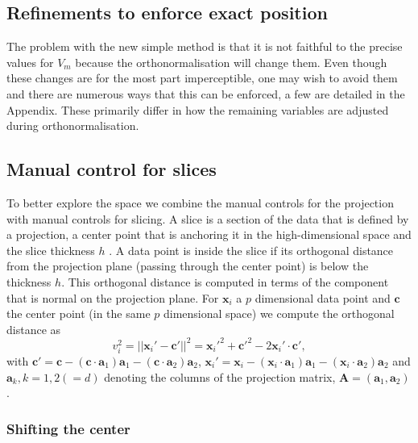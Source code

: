 \documentclass[]{interact}
\theoremstyle{plain}%
\theoremstyle{definition}
\theoremstyle{remark}
\begin{document}
\hypertarget{refinements-to-enforce-exact-position}{%
\subsection{Refinements to enforce exact
position}\label{refinements-to-enforce-exact-position}}

The problem with the new simple method is that it is not faithful to the
precise values for \(V_m\) because the orthonormalisation will change
them. Even though these changes are for the most part imperceptible, one
may wish to avoid them and there are numerous ways that this can be
enforced, a few are detailed in the Appendix. These primarily differ in
how the remaining variables are adjusted during orthonormalisation.

\hypertarget{manual-control-for-slices}{%
\subsection{Manual control for slices}\label{manual-control-for-slices}}

To better explore the space we combine the manual controls for the
projection with manual controls for slicing. A slice is a section of the
data that is defined by a projection, a center point that is anchoring
it in the high-dimensional space and the slice thickness \(h\)
\citep{slicetour}. A data point is inside the slice if its orthogonal
distance from the projection plane (passing through the center point) is
below the thickness \(h\). This orthogonal distance is computed in terms
of the component that is normal on the projection plane. For
\(\mathbf{x}_i\) a \(p\) dimensional data point and \(\mathbf{c}\) the
center point (in the same \(p\) dimensional space) we compute the
orthogonal distance as \begin{equation}
v_i^2 = ||\mathbf{x}_i' - \mathbf{c}'||^2 = \mathbf{x}_i'^2 + \mathbf{c}'^2 - 2 \mathbf{x}_i'\cdot\mathbf{c}' ,
\label{eq:slice}
\end{equation} with
\(\mathbf{c}' = \mathbf{c} - (\mathbf{c}\cdot \mathbf{a}_1) \mathbf{a}_1 - (\mathbf{c}\cdot \mathbf{a}_2 )\mathbf{a}_2\),
\(\mathbf{x}_i' = \mathbf{x}_i - (\mathbf{x}_i\cdot \mathbf{a}_1) \mathbf{a}_1 - (\mathbf{x}_i\cdot \mathbf{a}_2) \mathbf{a}_2\)
and \(\mathbf{a}_k, k=1,2 (=d)\) denoting the columns of the projection
matrix, \(\mathbf{A}=(\mathbf{a}_1, \mathbf{a}_2)\).

\hypertarget{shifting-the-center}{%
\subsubsection{Shifting the center}\label{shifting-the-center}}
\end{document}
